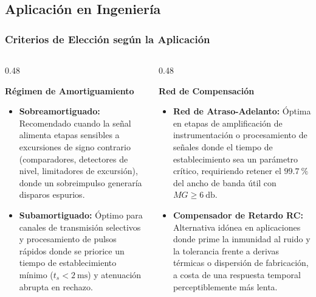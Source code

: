 \documentclass[aspectratio=169, 10pt]{beamer}
\begin{document}
\subsection{Aplicación en Ingeniería}
\begin{frame}
  \frametitle{Criterios de Elección según la Aplicación}

  \begin{columns}[t, onlytextwidth]
    \begin{column}{0.48\textwidth}
      \begin{tarjeta}
        {\fontsize{9pt}{11pt}\selectfont \textbf{\color{NavyDark} Régimen de Amortiguamiento}}\\[2pt]
        {\fontsize{8pt}{10pt}\selectfont
        \begin{itemize}\setlength{\itemsep}{2.5pt}
          \item \textbf{Sobreamortiguado:}
          Recomendado cuando la señal alimenta etapas sensibles a excursiones de signo contrario (comparadores, detectores de nivel, limitadores de excursión), donde un sobreimpulso generaría disparos espurios.
          \item \textbf{Subamortiguado:}
          Óptimo para canales de transmisión selectivos y procesamiento de pulsos rápidos donde se priorice un tiempo de establecimiento mínimo ($t_s < \qty{2}{\milli\second}$) y atenuación abrupta en rechazo.
        \end{itemize}
        }
      \end{tarjeta}
    \end{column}

    \begin{column}{0.48\textwidth}
      \begin{tarjeta}
        {\fontsize{9pt}{11pt}\selectfont \textbf{\color{NavyDark} Red de Compensación}}\\[2pt]
        {\fontsize{8pt}{10pt}\selectfont
        \begin{itemize}\setlength{\itemsep}{2.5pt}
          \item \textbf{Red de Atraso-Adelanto:}
          Óptima en etapas de amplificación de instrumentación o procesamiento de señales donde el tiempo de establecimiento sea un parámetro crítico, requiriendo retener el $\qty{99.7}{\percent}$ del ancho de banda útil con $MG \ge \qty{6}{\decibel}$.
          \item \textbf{Compensador de Retardo RC:}
          Alternativa idónea en aplicaciones donde prime la inmunidad al ruido y la tolerancia frente a derivas térmicas o dispersión de fabricación, a costa de una respuesta temporal perceptiblemente más lenta.
        \end{itemize}
        }
      \end{tarjeta}
    \end{column}
  \end{columns}
\end{frame}
\end{document}
